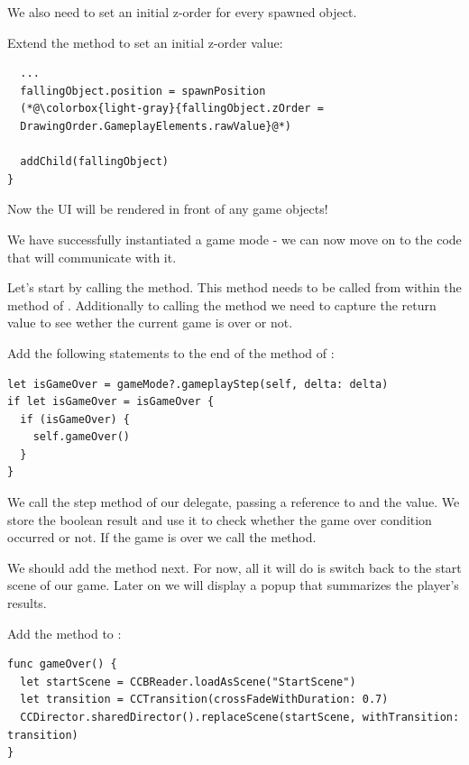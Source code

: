 We also need to set an initial z-order for every spawned object.

\begin{leftbar}
Extend the  method to set an initial z-order value:
\begin{lstlisting}
  ...
  fallingObject.position = spawnPosition
  (*@\colorbox{light-gray}{fallingObject.zOrder =
  DrawingOrder.GameplayElements.rawValue}@*)
  
  addChild(fallingObject)
}
\end{lstlisting}
\end{leftbar}

Now the UI will be rendered in front of any game objects!

We have successfully instantiated a game mode - we can now move on to the code
that will communicate with it. 

Let's start by calling the
 method. This method needs to be
called from within the  method of .
Additionally to calling the method we need to capture the return value to see
wether the current game is over or not.

\begin{leftbar}
Add the following statements to the end of the  method of
:
\begin{lstlisting}
let isGameOver = gameMode?.gameplayStep(self, delta: delta)
if let isGameOver = isGameOver {
  if (isGameOver) {
    self.gameOver()
  }
}
\end{lstlisting}
\end{leftbar}
We call the step method of our delegate, passing a reference to
 and the  value. We store the boolean result
and use it to check whether the game over condition occurred or not. If the game
is over we call the  method.

We should add the  method next. For now, all it will do is
switch back to the start scene of our game. Later on we will display a popup
that summarizes the player's results.

\begin{leftbar}
Add the  method to :
\begin{lstlisting}
func gameOver() {
  let startScene = CCBReader.loadAsScene("StartScene")
  let transition = CCTransition(crossFadeWithDuration: 0.7)
  CCDirector.sharedDirector().replaceScene(startScene, withTransition: transition)
}
\end{lstlisting}
\end{leftbar}

